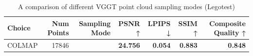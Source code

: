 \begin{table}[H]
\caption{A comparison of different VGGT point cloud sampling modes (Legotest)}
\label{tab:03_sampling_mode_legotest}
\begin{tabular}{lrrrrrr}
\toprule
Choice & Num Points & Sampling Mode & PSNR ↑ & LPIPS ↓ & SSIM ↑ & Composite Quality ↑ \\
\midrule
COLMAP & 17846 &  & \textbf{24.756} & \textbf{0.054} & \textbf{0.883} & \textbf{0.848} \\
\bottomrule
\end{tabular}
\end{table}
